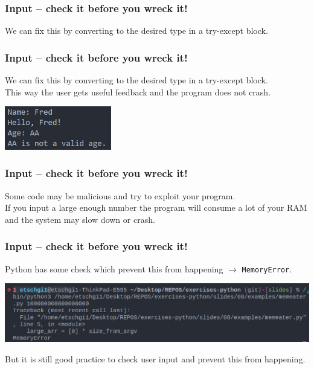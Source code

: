 \documentclass{beamer}
\begin{document}
\begin{frame}
  \frametitle{Input -- check it before you wreck it!}
  We can fix this by converting to the desired type in a try-except block.\\
  
\end{frame}
\begin{frame}
  \frametitle{Input -- check it before you wreck it!}
  We can fix this by converting to the desired type in a try-except block. \\
  \vspace{5mm}
  This way the user gets useful feedback and the program does not crash.\\  
  \begin{center}
    \includegraphics[width=0.35\textwidth]{examples/fig/inputchecked.png}
  \end{center}
\end{frame}
\begin{frame}
  \frametitle{Input -- check it before you wreck it!}
  Some code may be malicious and try to exploit your program.\\
  
  If you input a large enough number the program will consume a lot of your RAM and the system may slow down or crash.\\
\end{frame}
\begin{frame}
  \frametitle{Input -- check it before you wreck it!}
  Python has some check which prevent this from happening $\rightarrow$ \texttt{MemoryError}.\\
  \begin{center}
    \includegraphics[width=\textwidth]{examples/fig/memerror.png}
  \end{center}
  But it is still good practice to check user input and prevent this from happening.\\
\end{frame}
\end{document}
